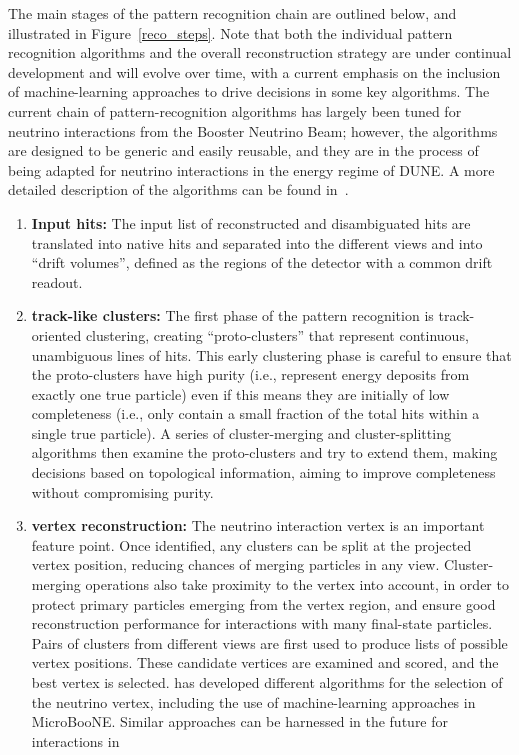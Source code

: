 The main stages of the  pattern recognition chain are outlined below, and illustrated in Figure~\ref{reco_steps}. Note that both the individual pattern recognition algorithms and the overall reconstruction strategy are under continual development and will evolve over time, with a current emphasis %
on the inclusion of machine-learning approaches to drive decisions in some key algorithms. The current chain of pattern-recognition algorithms has largely been tuned for neutrino interactions from the \fnal Booster Neutrino Beam; however, the algorithms are designed to be generic and easily reusable, and they are in the process of being adapted for neutrino interactions in the energy regime of DUNE. A more detailed description of the algorithms can be found in~\cite{Acciarri:2017hat}. 


\begin{enumerate}
\item{\bf Input hits:} The input list of reconstructed and disambiguated \twod hits are translated into native  \twod hits and separated into the different views and into ``drift volumes'', defined as the regions of the detector with a common drift readout.
\item{\bf \twod track-like clusters:}  The first phase of the  pattern recognition is track-oriented \twod clustering, creating ``proto-clusters'' that represent continuous, unambiguous lines of \twod hits. This early clustering phase is careful to ensure that the proto-clusters have high purity (i.e., represent energy deposits from exactly one true particle) even if this means they are initially of low completeness (i.e., only contain a small fraction of the total hits within a single true particle). A series of cluster-merging and cluster-splitting algorithms then examine the \twod proto-clusters and try to extend them, making decisions based on topological information, aiming to improve completeness without compromising purity.
\item{\bf \threed vertex reconstruction:} The neutrino interaction vertex is an important feature point. Once identified, any \twod clusters can be split at the projected vertex position, reducing chances of merging particles in any view. Cluster-merging operations also take proximity to the vertex into account, in order to protect primary particles emerging from the vertex region, and ensure good reconstruction performance for interactions with many final-state particles. Pairs of \twod clusters from different views are first used to produce lists of possible \threed vertex positions. These candidate vertices are examined and scored, and the best vertex is selected.  has developed different algorithms for the selection of the neutrino vertex, including the use of machine-learning approaches in MicroBooNE. Similar approaches can be harnessed in the future for interactions in %

\end{enumerate}
